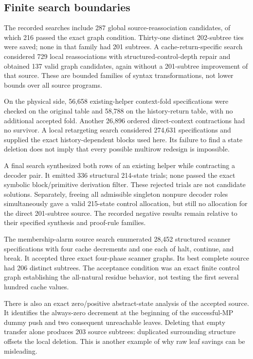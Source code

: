 \documentclass[11pt]{article}
\theoremstyle{definition}
\begin{document}
\subsection{Finite search boundaries}

The recorded searches include 287 global source-reassociation candidates,
of which 216 passed the exact graph condition. Thirty-one distinct
202-subtree ties were saved; none in that family had 201 subtrees. A
cache-return-specific search considered 729 local reassociations with
structured-control-depth repair and obtained 137 valid graph candidates,
again without a 201-subtree improvement of that source. These are bounded
families of syntax transformations, not lower bounds over all source
programs.

On the physical side, 56,658 existing-helper context-fold specifications
were checked on the original table and 58,788 on the history-return table,
with no additional accepted fold. Another 26,896 ordered direct-context
contractions had no survivor. A local retargeting search considered
274,631 specifications and supplied the exact history-dependent blocks
used here. Its failure to find a state deletion does not imply that every
possible multirow redesign is impossible.

A final search synthesized both rows of an existing helper while
contracting a decoder pair. It emitted 336 structural 214-state trials;
none passed the exact symbolic block/primitive derivation filter. These
rejected trials are not candidate solutions. Separately, freeing all
admissible singleton nonpure decoder roles simultaneously gave a valid
215-state control allocation, but still no allocation for the direct
201-subtree source. The recorded negative results remain relative to their
specified synthesis and proof-rule families.

The membership-alarm source search enumerated 28,452 structured scanner
specifications with four cache decrements and one each of halt, continue,
and break. It accepted three exact four-phase scanner graphs. Its best
complete source had 206 distinct subtrees. The acceptance condition was an
exact finite control graph establishing the all-natural residue behavior,
not testing the first several hundred cache values.

There is also an exact zero/positive abstract-state analysis of the
accepted source. It identifies the always-zero decrement at the beginning
of the successful-MP dummy push and two consequent unreachable leaves.
Deleting that empty transfer alone produces 203 source subtrees: duplicated
surrounding structure offsets the local deletion. This is another example
of why raw leaf savings can be misleading.
\end{document}
